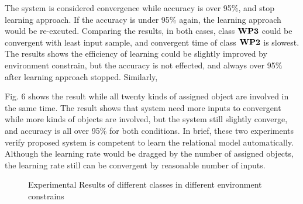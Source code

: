 \documentclass[journal]{IEEEtran}
\begin{document}
The system is considered convergence while accuracy is over 95$\%$, and stop learning approach. If the accuracy is under 95$\%$ again, the learning approach would be re-excuted. Comparing the results, in both cases, class $\bf{WP3}$ could be convergent with least input sample, and convergent time of class $\bf{WP2}$ is slowest. The results shows the efficiency of learning could be slightly improved by environment constrain, but the accuracy is not effected, and always over 95$\%$ after learning approach stopped. Similarly, 
 
Fig. 6 shows the result while all twenty kinds of assigned object are involved in the same time. The result shows that system need more inputs to convergent while more kinds of objects are involved, but the system still slightly converge, and accuracy is all over 95$\%$ for both conditions. In brief, these two experiments verify proposed system is competent to learn the relational model automatically. Although the learning rate would be dragged by the number of assigned objects, the learning rate still can be convergent by reasonable number of inputs. 


 
\begin{figure}[!t]
\centering


\caption{Experimental Results of different classes in different environment constrains}

\end{figure}
\end{document}
